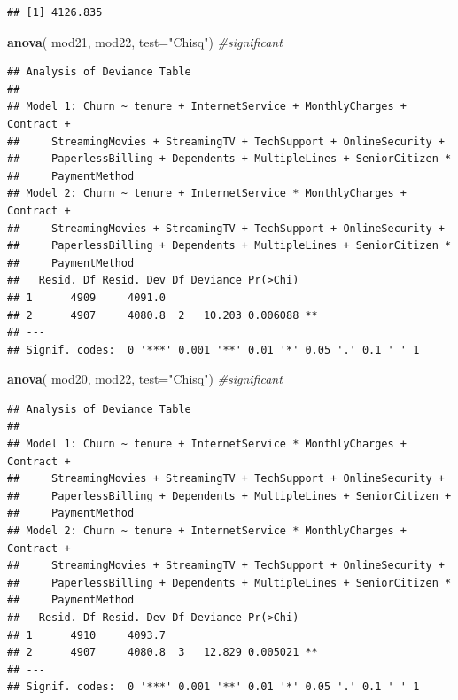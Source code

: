 \documentclass[
  twoside]{article}
\newenvironment{Shaded}{\begin{snugshade}}{\end{snugshade}}
\newcommand{\AttributeTok}[1]{\textcolor[rgb]{0.13,0.29,0.53}{#1}}
\newcommand{\CommentTok}[1]{\textcolor[rgb]{0.56,0.35,0.01}{\textit{#1}}}
\newcommand{\FunctionTok}[1]{\textcolor[rgb]{0.13,0.29,0.53}{\textbf{#1}}}
\newcommand{\NormalTok}[1]{#1}
\newcommand{\StringTok}[1]{\textcolor[rgb]{0.31,0.60,0.02}{#1}}
\begin{document}
\begin{verbatim}
## [1] 4126.835
\end{verbatim}

\begin{Shaded}
\begin{Highlighting}[]
\FunctionTok{anova}\NormalTok{( mod21, mod22,  }\AttributeTok{test=}\StringTok{"Chisq"}\NormalTok{) }\CommentTok{\#significant}
\end{Highlighting}
\end{Shaded}

\begin{verbatim}
## Analysis of Deviance Table
## 
## Model 1: Churn ~ tenure + InternetService + MonthlyCharges + Contract + 
##     StreamingMovies + StreamingTV + TechSupport + OnlineSecurity + 
##     PaperlessBilling + Dependents + MultipleLines + SeniorCitizen * 
##     PaymentMethod
## Model 2: Churn ~ tenure + InternetService * MonthlyCharges + Contract + 
##     StreamingMovies + StreamingTV + TechSupport + OnlineSecurity + 
##     PaperlessBilling + Dependents + MultipleLines + SeniorCitizen * 
##     PaymentMethod
##   Resid. Df Resid. Dev Df Deviance Pr(>Chi)   
## 1      4909     4091.0                        
## 2      4907     4080.8  2   10.203 0.006088 **
## ---
## Signif. codes:  0 '***' 0.001 '**' 0.01 '*' 0.05 '.' 0.1 ' ' 1
\end{verbatim}

\begin{Shaded}
\begin{Highlighting}[]
\FunctionTok{anova}\NormalTok{( mod20, mod22,  }\AttributeTok{test=}\StringTok{"Chisq"}\NormalTok{) }\CommentTok{\#significant}
\end{Highlighting}
\end{Shaded}

\begin{verbatim}
## Analysis of Deviance Table
## 
## Model 1: Churn ~ tenure + InternetService * MonthlyCharges + Contract + 
##     StreamingMovies + StreamingTV + TechSupport + OnlineSecurity + 
##     PaperlessBilling + Dependents + MultipleLines + SeniorCitizen + 
##     PaymentMethod
## Model 2: Churn ~ tenure + InternetService * MonthlyCharges + Contract + 
##     StreamingMovies + StreamingTV + TechSupport + OnlineSecurity + 
##     PaperlessBilling + Dependents + MultipleLines + SeniorCitizen * 
##     PaymentMethod
##   Resid. Df Resid. Dev Df Deviance Pr(>Chi)   
## 1      4910     4093.7                        
## 2      4907     4080.8  3   12.829 0.005021 **
## ---
## Signif. codes:  0 '***' 0.001 '**' 0.01 '*' 0.05 '.' 0.1 ' ' 1
\end{verbatim}
\end{document}
